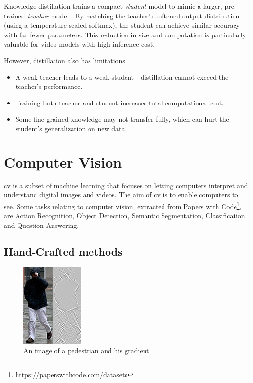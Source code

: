 Knowledge distillation trains a compact \emph{student} model to mimic a larger, pre-trained \emph{teacher} model \cite{denize_comedian_2024, li_videomamba_2024, bose_soccerkdnet_2023}. By matching the teacher’s softened output distribution (using a temperature-scaled softmax), the student can achieve similar accuracy with far fewer parameters. This reduction in size and computation is particularly valuable for video models with high inference cost.

However, distillation also has limitations:
\begin{itemize}
    \item A weak teacher leads to a weak student—distillation cannot exceed the teacher’s performance.
    \item Training both teacher and student increases total computational cost.
    \item Some fine-grained knowledge may not transfer fully, which can hurt the student’s generalization on new data.
\end{itemize}


\section{Computer Vision} 
\label{sec:computer_vision}

\acrfull{cv} is a subset of machine learning that focuses on letting computers interpret and understand digital images and videos. The aim of \acrlong{cv} is to enable computers to see. Some tasks relating to computer vision, extracted from Papers with Code\footnote{\url{https://paperswithcode.com/datasets}}, are Action Recognition, Object Detection, Semantic Segmentation, Classification and Question Answering. 

\subsection{Hand-Crafted methods}

\begin{figure}
    \centering
    \includegraphics[width=0.5\linewidth]{figures/Pedestrian_gradient.jpg}
    \caption{An image of a pedestrian and his gradient}
    \label{fig:pedestrian_gradient}
\end{figure}


